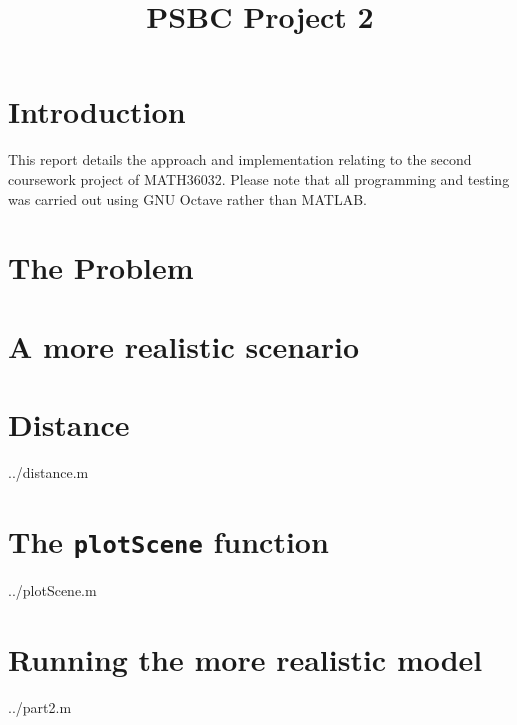 \documentclass[10pt]{article}
\title{PSBC Project 2}
\newcommand{\inlinemaketitle}{{\let\newpage\relax\maketitle}}
\begin{document}
\inlinemaketitle
\section{Introduction}

This report details the approach and implementation relating to the second coursework project of MATH36032. Please note that all programming and testing was carried out using GNU Octave rather than MATLAB.

\section{The Problem}



\section{A more realistic scenario}


\begin{appendices}

\section{Distance}\label{ap:distance}
  {../distance.m}


\section{The \texttt{plotScene} function}\label{ap:plotScene}
  {../plotScene.m}

\section{Running the more realistic model}\label{ap:part2}
  {../part2.m}
\end{appendices}
\end{document}
